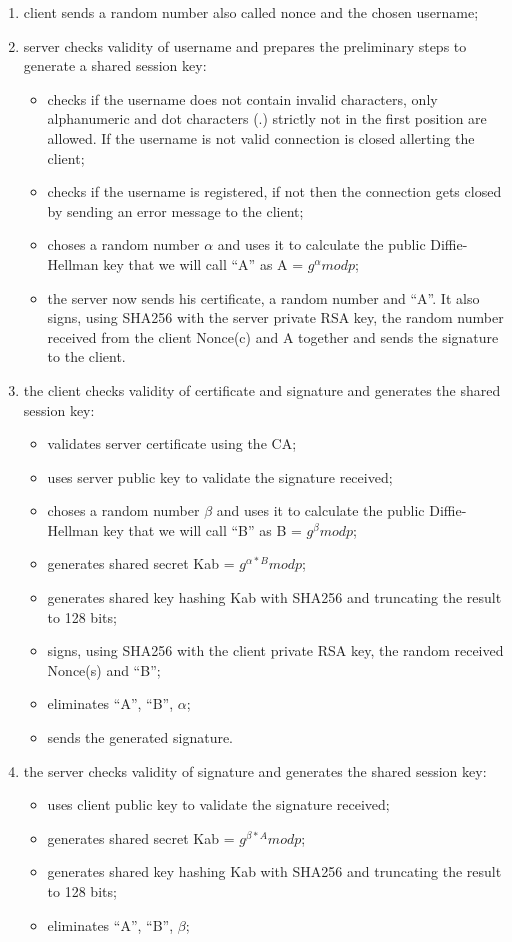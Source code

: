 \begin{enumerate}
	\item client sends a random number also called nonce and the chosen username;
	\item server checks validity of username and prepares the preliminary steps to generate a shared session key:
	\begin{itemize}
		\item checks if the username does not contain invalid characters, only alphanumeric and dot characters (.) strictly not in the first position are allowed. If the username is not valid connection is closed allerting the client;
		\item checks if the username is registered, if not then the connection gets closed by sending an error message to the client;
		\item choses a random number \(\alpha\) and uses it to calculate the public Diffie-Hellman key that we will call ``A'' as A = \(g^\alpha mod p \);
		\item the server now sends his certificate, a random number and ``A''. It also signs, using SHA256 with the server private RSA key, the random number received from the client Nonce(c) and A together and sends the signature to the client.
	\end{itemize}
	\item the client checks validity of certificate and signature and generates the shared session key:
	\begin{itemize}
		\item validates server certificate using the CA;
		\item uses server public key to validate the signature received;
		\item choses a random number \(\beta\) and uses it to calculate the public Diffie-Hellman key that we will call ``B'' as B = \(g^\beta mod p \);
		\item generates shared secret Kab = \(g^{\alpha*B} mod p\);
		\item generates shared key hashing Kab with SHA256 and truncating the result to 128 bits;
		\item signs, using SHA256 with the client private RSA key, the random received Nonce(s) and ``B'';
		\item eliminates ``A'', ``B'', \(\alpha\);
		\item sends the generated signature. 
	\end{itemize}
	\item the server checks validity of signature and generates the shared session key:
	\begin{itemize}
		\item uses client public key to validate the signature received;
		\item generates shared secret Kab = \(g^{\beta*A} mod p\);
		\item generates shared key hashing Kab with SHA256 and truncating the result to 128 bits;
		\item eliminates ``A'', ``B'', \(\beta\);
	\end{itemize}	 
\end{enumerate}

